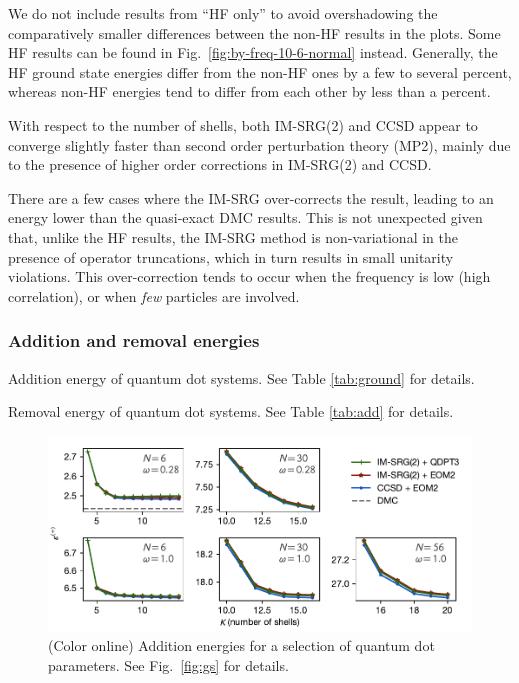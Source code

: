 \documentclass[aip, jcp, 12pt]{revtex4-1}
\begin{document}
We do not include results from ``HF only'' to avoid overshadowing the comparatively smaller differences between the non-HF results in the plots.  Some HF results can be found in Fig.\ \ref{fig:by-freq-10-6-normal} instead.  Generally, the HF ground state energies differ from the non-HF ones by a few to several percent, whereas non-HF energies tend to differ from each other by less than a percent.

With respect to the number of shells, both IM-SRG(2) and CCSD appear to converge slightly faster than second order perturbation theory (MP2), mainly due to the presence of higher order corrections in IM-SRG(2) and CCSD.

There are a few cases where the IM-SRG over-corrects the result, leading to an energy lower than the quasi-exact DMC results.  This is not unexpected given that, unlike the HF results, the IM-SRG method is non-variational in the presence of operator truncations, which in turn results in small unitarity violations.  This over-correction tends to occur when the frequency is low (high correlation), or when \emph{few} particles are involved.

\subsubsection{Addition and removal energies}

\begin{table}
  \centering
  \caption{Addition energy of quantum dot systems.  See Table \ref{tab:ground} for details.}
  \label{tab:add}
  \unskip
\end{table}

\begin{table}
  \centering
  \caption{Removal energy of quantum dot systems.  See Table \ref{tab:add} for details.}
  \label{tab:rm}
  \unskip
\end{table}

\begin{figure}
  \centering
  \includegraphics{fig-add2.pdf}
  \caption{(Color online) Addition energies for a selection of quantum dot parameters.  See Fig.\ \ref{fig:gs} for details.}
  \label{fig:add}
\end{figure}
\end{document}
